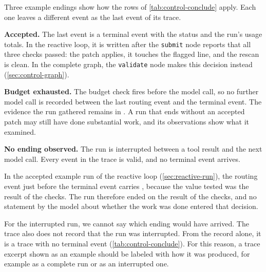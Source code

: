 Three example endings show how the rows of \cref{tab:control-conclude} apply. Each one leaves a
different event as the last event of its trace.

\bi
\item \textbf{Accepted.} The last event is a terminal event with the status  and
the run's usage totals. In the reactive loop, it is written after the \texttt{submit} node reports
that all three checks passed: the patch applies, it touches the flagged line, and the rescan is
clean. In the complete graph, the \texttt{validate} node makes this decision instead
(\cref{sec:control-graph}).
\item \textbf{Budget exhausted.} The budget check fires before the model call, so no further model
call is recorded between the last routing event and the terminal event. The evidence the run
gathered remains in . A run that ends without an accepted patch may still
have done substantial work, and its observations show what it examined.
\item \textbf{No ending observed.} The run is interrupted between a tool result and the next model
call. Every event in the trace is valid, and no terminal event arrives.
\ei

In the accepted example run of the reactive loop (\cref{sec:reactive-run}), the routing event just
before the terminal event carries , because the value tested was the result
of the checks. The run therefore ended on the result of the checks, and no statement by the model
about whether the work was done entered that decision.

For the interrupted run, we cannot say which ending would have arrived. The trace also does not
record that the run was interrupted. From the record alone, it is a trace with no terminal event
(\cref{tab:control-conclude}). For this reason, a trace excerpt shown as an example should be
labeled with how it was produced, for example as a complete run or as an interrupted one.

